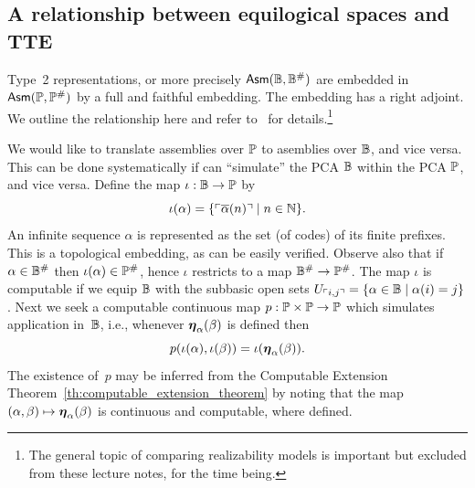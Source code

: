 \subsection{A relationship between equilogical spaces and TTE}
\label{sec:equ-tte}

Type~2 representations, or more precisely $\mathsf{Asm}(\mathbb{B},
  \mathbb{B}^{\#})$ are embedded in $\mathsf{Asm}(\mathbb{P}, \mathbb{P}^{\#})$ by a
full and faithful embedding. The embedding has a right adjoint. We
outline the relationship here and refer to~\cite{Bauer:equ-tte} for
details.\footnote{The general topic of comparing realizability models
  is important but excluded from these lecture notes, for the time
  being.}

We would like to translate assemblies over $\mathbb{P}$ to asemblies over
$\mathbb{B}$, and vice versa. This can be done systematically if can
``simulate'' the PCA $\mathbb{B}$ within the PCA $\mathbb{P}$, and vice versa.
%
Define the map $\iota : \mathbb{B} \to \mathbb{P}$ by
\begin{equation*}
  \iota(\alpha) =
  \{ \ulcorner \overline{\alpha}(n) \urcorner \mid n \in \mathbb{N}\}.
\end{equation*}
An infinite sequence $\alpha$ is represented as the set (of codes) of
its finite prefixes. This is a topological embedding, as can be easily
verified. Observe also that if $\alpha \in \mathbb{B}^{\#}$ then
$\iota(\alpha) \in \mathbb{P}^{\#}$, hence $\iota$ restricts to a map
$\mathbb{B}^{\#} \to \mathbb{P}^{\#}$.
%
The map $\iota$ is computable if we equip $\mathbb{B}$ with the subbasic
open sets $U_{\ulcorner i,j \urcorner} = \{\alpha \in \mathbb{B} \mid \alpha(i) =
  j\}$. Next we seek a computable continuous map $p : \mathbb{P} \times
\mathbb{P} \to \mathbb{P}$ which simulates application in~$\mathbb{B}$, i.e.,
whenever $\text{\boldmath{$\eta$}}_{\alpha}(\beta)$ is defined then
%
\begin{equation*}
  p (\iota(\alpha), \iota(\beta)) = \iota(\text{\boldmath{$\eta$}}_{\alpha}(\beta)).
\end{equation*}
%
The existence of~$p$ may be inferred from the Computable Extension
Theorem~\ref{th:computable_extension_theorem} by noting that the map
$(\alpha, \beta) \mapsto \text{\boldmath{$\eta$}}_{\alpha}(\beta)$ is continuous and
computable, where defined.

